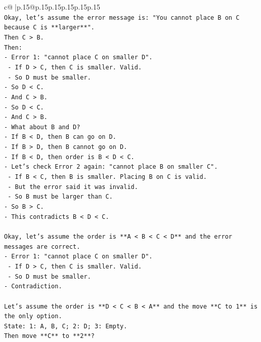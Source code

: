 \documentclass{article}
\begin{document}
{\begin{supertabular}{c@{$\;$}|p{.15\linewidth}@{}p{.15\linewidth}p{.15\linewidth}p{.15\linewidth}p{.15\linewidth}p{.15\linewidth}}
{{{\\ 
\texttt{Okay, let's assume the error message is: "You cannot place B on C because C is **larger**".} \\
\texttt{Then C > B.} \\
\texttt{Then:} \\
\texttt{{-} Error 1: "cannot place C on smaller D".} \\
\texttt{    {-} If D > C, then C is smaller. Valid.} \\
\texttt{    {-} So D must be smaller.} \\
\texttt{{-} So D < C.} \\
\texttt{{-} And C > B.} \\
\texttt{{-} So D < C.} \\
\texttt{{-} And C > B.} \\
\texttt{{-} What about B and D?} \\
\texttt{{-} If B < D, then B can go on D.} \\
\texttt{{-} If B > D, then B cannot go on D.} \\
\texttt{{-} If B < D, then order is B < D < C.} \\
\texttt{{-} Let's check Error 2 again: "cannot place B on smaller C".} \\
\texttt{    {-} If B < C, then B is smaller. Placing B on C is valid.} \\
\texttt{    {-} But the error said it was invalid.} \\
\texttt{    {-} So B must be larger than C.} \\
\texttt{{-} So B > C.} \\
\texttt{{-} This contradicts B < D < C.} \\
\\ 
\texttt{Okay, let's assume the order is **A < B < C < D** and the error messages are correct.} \\
\texttt{{-} Error 1: "cannot place C on smaller D".} \\
\texttt{    {-} If D > C, then C is smaller. Valid.} \\
\texttt{    {-} So D must be smaller.} \\
\texttt{{-} Contradiction.} \\
\\ 
\texttt{Let's assume the order is **D < C < B < A** and the move **C to 1** is the only option.} \\
\texttt{State: 1: A, B, C; 2: D; 3: Empty.} \\
\texttt{Then move **C** to **2**?} \\
}}}
\end{supertabular}}
\end{document}
